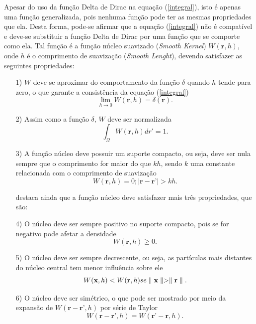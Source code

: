 Apesar do uso da função Delta de Dirac na equação (\ref{integral}), isto é apenas uma função generalizada, pois nenhuma função pode ter as mesmas propriedades que ela. Desta forma, pode-se afirmar que a equação (\ref{integral}) não é compatível e deve-se substituir a função Delta de Dirac por uma função que se comporte como ela. Tal função é a função núcleo suavizado (\textit{Smooth Kernel}) $W(\textbf{r},h)$, onde $h$ é o comprimento de suavização (\textit{Smooth Lenght}), devendo satisfazer as seguintes propriedades:
\begin{enumerate}
	\item[1)] $W$ deve se aproximar do comportamento da função $\delta$ quando $h$ tende para zero, o que garante a consistência da equação (\ref{integral})
	\begin{equation}
	\lim\limits_{h \rightarrow 0} W(\textbf{r},h) = \delta(\textbf{r}).
	\end{equation}
	
	\item[2)] Assim como a função $\delta$, $W$ deve ser normalizada
	\begin{equation}
	\int_{\Omega} W(\textbf{r},h) dr' = 1.
	\end{equation}
	
	\item[3)] A função núcleo deve possuir um suporte compacto, ou seja, deve ser nula sempre que o comprimento for maior do que $kh$, sendo $k$ uma constante relacionada com o comprimento de suavização
	\begin{equation}
	W(\textbf{r},h) = 0 ; |\textbf{r} - \textbf{r'}| > kh.
	\end{equation}
	
	 destaca ainda que a função núcleo deve satisfazer mais três propriedades, que são:
	\item[4)] O núcleo deve ser sempre positivo no suporte compacto, pois se for negativo pode afetar a densidade
	\begin{equation}
	W(\textbf{r},h) \geq 0.
	\end{equation}
	
	\item[5)] O núcleo deve ser sempre decrescente, ou seja, as partículas mais distantes do núcleo central tem menor influência sobre ele
	\begin{equation}
	W(\textbf{x},h) < W(\textbf{r},h)  \\ se \\ \parallel \textbf{x} \parallel > \parallel \textbf{r} \parallel.
	\end{equation}        
	
	\item[6)] O núcleo deve ser simétrico, o que pode ser mostrado por meio da expansão de $W(\textbf{r} - \textbf{r'},h)$ por série de Taylor \cite{Monaghan1992}
	\begin{equation}
	W(\textbf{r} - \textbf{r'},h) = W(\textbf{r'} - \textbf{r},h).
	\end{equation}
\end{enumerate}

